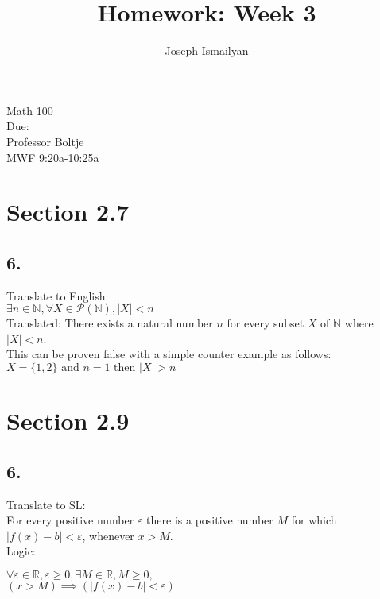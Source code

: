 \documentclass[12pt]{article}
\newcommand{\dueDate}{\formatdate{13}{10}{2017}}
\begin{document}
	

\title{Homework: Week 3}
\author{Joseph Ismailyan}
\date{}
\maketitle
\begin{flushleft}
Math 100 \\
Due: \dueDate \\ 
Professor Boltje \\
MWF 9:20a-10:25a
\end{flushleft}

\begin{minipage}[t]{0.40\textwidth}

\section*{Section 2.7}
\subsection*{6.}
Translate to English: \\$  \exists n \in \mathbb{N}, \forall X \in \mathscr{P}(\mathbb{N}) , |X| < n$\\

Translated: There exists a natural number $ n $ for every subset $ X $ of $ \mathbb{N} $ where $ |X| <n $.\\

This can be proven false with a simple counter example as follows: \\ $ X=\{1,2\} \text{ and } n=1 \text{ then } |X| > n$


\section*{Section 2.9}
\subsection*{6.}
Translate to SL:\\
For every positive number $ \varepsilon $ there is a positive number $ M $ for which \\$ |f(x)-b|<\varepsilon $, whenever $ x>M $.\\

Logic:

$\forall \varepsilon\in\mathbb{R},\varepsilon\geq 0, \exists M\in\mathbb{R},M\geq 0,$
\\
$
(x>M) \implies (|f(x)-b|<\varepsilon)
$

\end{minipage}
\end{document}
